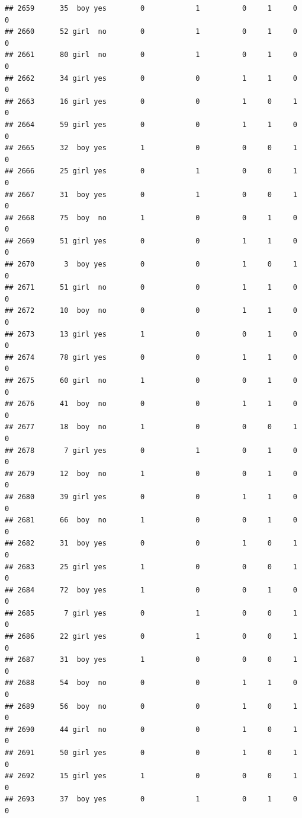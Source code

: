 \documentclass[man]{apa6}
\begin{document}
\begin{verbatim}
## 2659      35  boy yes        0            1          0     1     0     0
## 2660      52 girl  no        0            1          0     1     0     0
## 2661      80 girl  no        0            1          0     1     0     0
## 2662      34 girl yes        0            0          1     1     0     0
## 2663      16 girl yes        0            0          1     0     1     0
## 2664      59 girl yes        0            0          1     1     0     0
## 2665      32  boy yes        1            0          0     0     1     0
## 2666      25 girl yes        0            1          0     0     1     0
## 2667      31  boy yes        0            1          0     0     1     0
## 2668      75  boy  no        1            0          0     1     0     0
## 2669      51 girl yes        0            0          1     1     0     0
## 2670       3  boy yes        0            0          1     0     1     0
## 2671      51 girl  no        0            0          1     1     0     0
## 2672      10  boy  no        0            0          1     1     0     0
## 2673      13 girl yes        1            0          0     1     0     0
## 2674      78 girl yes        0            0          1     1     0     0
## 2675      60 girl  no        1            0          0     1     0     0
## 2676      41  boy  no        0            0          1     1     0     0
## 2677      18  boy  no        1            0          0     0     1     0
## 2678       7 girl yes        0            1          0     1     0     0
## 2679      12  boy  no        1            0          0     1     0     0
## 2680      39 girl yes        0            0          1     1     0     0
## 2681      66  boy  no        1            0          0     1     0     0
## 2682      31  boy yes        0            0          1     0     1     0
## 2683      25 girl yes        1            0          0     0     1     0
## 2684      72  boy yes        1            0          0     1     0     0
## 2685       7 girl yes        0            1          0     0     1     0
## 2686      22 girl yes        0            1          0     0     1     0
## 2687      31  boy yes        1            0          0     0     1     0
## 2688      54  boy  no        0            0          1     1     0     0
## 2689      56  boy  no        0            0          1     0     1     0
## 2690      44 girl  no        0            0          1     0     1     0
## 2691      50 girl yes        0            0          1     0     1     0
## 2692      15 girl yes        1            0          0     0     1     0
## 2693      37  boy yes        0            1          0     1     0     0

\end{verbatim}
\end{document}
